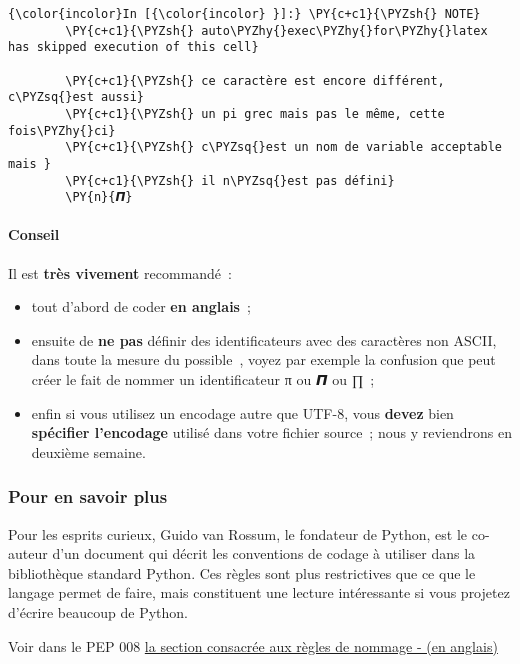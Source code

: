     \begin{Verbatim}[commandchars=\\\{\}]
{\color{incolor}In [{\color{incolor} }]:} \PY{c+c1}{\PYZsh{} NOTE}
        \PY{c+c1}{\PYZsh{} auto\PYZhy{}exec\PYZhy{}for\PYZhy{}latex has skipped execution of this cell}
        
        \PY{c+c1}{\PYZsh{} ce caractère est encore différent, c\PYZsq{}est aussi}
        \PY{c+c1}{\PYZsh{} un pi grec mais pas le même, cette fois\PYZhy{}ci}
        \PY{c+c1}{\PYZsh{} c\PYZsq{}est un nom de variable acceptable mais }
        \PY{c+c1}{\PYZsh{} il n\PYZsq{}est pas défini}
        \PY{n}{𝞟}
\end{Verbatim}


    \hypertarget{conseil}{%
\paragraph{Conseil}\label{conseil}}

Il est \textbf{très vivement} recommandé~:

\begin{itemize}
\tightlist
\item
  tout d'abord de coder \textbf{en anglais}~;
\item
  ensuite de \textbf{ne pas} définir des identificateurs avec des
  caractères non ASCII, dans toute la mesure du possible~, voyez par
  exemple la confusion que peut créer le fait de nommer un
  identificateur π ou 𝞟 ou ∏~;
\item
  enfin si vous utilisez un encodage autre que UTF-8, vous
  \textbf{devez} bien \textbf{spécifier l'encodage} utilisé dans votre
  fichier source~; nous y reviendrons en deuxième semaine.
\end{itemize}

    \hypertarget{pour-en-savoir-plus}{%
\subsubsection{Pour en savoir plus}\label{pour-en-savoir-plus}}

    Pour les esprits curieux, Guido van Rossum, le fondateur de Python, est
le co-auteur d'un document qui décrit les conventions de codage à
utiliser dans la bibliothèque standard Python. Ces règles sont plus
restrictives que ce que le langage permet de faire, mais constituent une
lecture intéressante si vous projetez d'écrire beaucoup de Python.

Voir dans le PEP 008
\href{http://legacy.python.org/dev/peps/pep-0008/\#descriptive-naming-styles}{la
section consacrée aux règles de nommage - (en anglais)}

